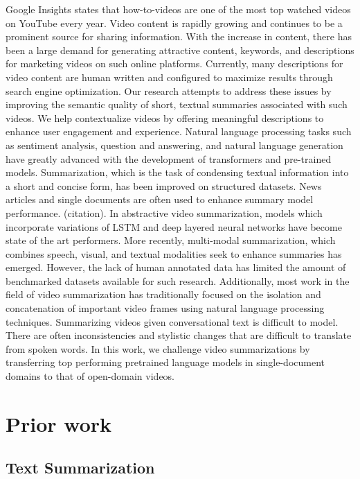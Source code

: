 \documentclass{article}
\begin{document}
Google Insights states that how-to-videos are one of the most top watched videos on YouTube every year. Video content is rapidly growing and continues to be a prominent source for sharing information. With the increase in content, there has been a large demand for generating attractive content, keywords, and descriptions for marketing videos on such online platforms. Currently, many descriptions for video content are human written and configured to maximize results through search engine optimization. Our research attempts to address these issues by improving the semantic quality of short, textual summaries associated with such videos. We help contextualize videos by offering meaningful descriptions to enhance user engagement and experience.
Natural language processing tasks such as sentiment analysis, question and answering, and natural language generation have greatly advanced with the development of transformers and pre-trained models. Summarization, which is the task of condensing textual information into a short and concise form, has been improved on structured datasets. News articles and single documents are often used to enhance summary model performance. (citation). In abstractive video summarization, models which incorporate variations of LSTM and deep layered neural networks have become state of the art performers. More recently, multi-modal summarization, which combines speech, visual, and textual modalities seek to enhance summaries has emerged. However, the lack of human annotated data has limited the amount of benchmarked datasets available for such research. Additionally, most work in the field of video summarization has traditionally focused on the isolation and concatenation of important video frames using natural language processing techniques. Summarizing videos given conversational text is difficult to model. There are often inconsistencies and stylistic changes that are difficult to translate from spoken words. In this work, we challenge video summarizations by transferring top performing pretrained language models in single-document domains to that of open-domain videos.  

\section{Prior work}

\subsection{Text Summarization}
\end{document}
